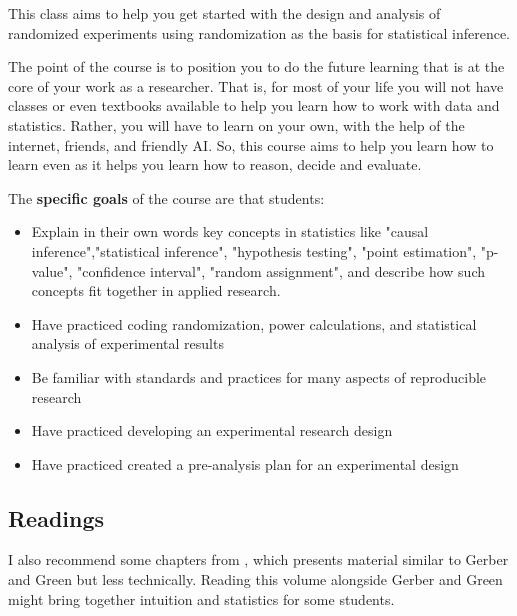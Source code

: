 \documentclass[10pt]{article}
\newenvironment{introstuff} {\setcounter{secnumdepth}{0}} {\setcounter{secnumdepth}{1}}
\begin{document}
\begin{introstuff}
This class aims to help you get started with the design and analysis of
randomized experiments using randomization as the basis for statistical
inference.

The point of the course is to position you to do the future learning
that is at the core of your work as a researcher. That is,
for most of your life you will not have classes or even textbooks
available to help you learn how to work with data and statistics.
Rather, you will have to learn on your own, with the help of the
internet, friends, and friendly AI. So, this course aims to help you
learn how to learn even as it helps you learn how to reason, decide and
evaluate.

The \textbf{specific goals} of the course are that students:

\begin{itemize}[noitemsep]

    \item Explain in their own words key concepts in statistics like "causal
        inference","statistical inference", "hypothesis testing", "point
        estimation", "p-value", "confidence interval", "random assignment", and
        describe how such concepts fit together in applied research.
    \item Have practiced coding randomization, power calculations, and statistical analysis
        of experimental results
    \item Be familiar with standards and practices for many aspects of reproducible research
    \item Have practiced developing an experimental research design
    \item Have practiced created a pre-analysis plan for an experimental design

\end{itemize}


\subsection{Readings}
\begin{verse}



\end{verse}

I also recommend some chapters from
\href{https://www-jstor-org.eui.idm.oclc.org/stable/j.ctt4cgd52}{\cite{glennerster13}},
which presents material similar to Gerber and Green but less technically.
Reading this volume alongside Gerber and Green might bring together intuition
and statistics for some students.


\end{introstuff}
\end{document}
